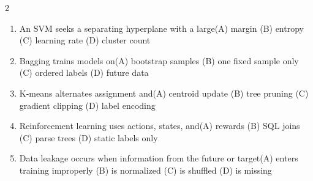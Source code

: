 \documentclass[a4paper]{article}
\begin{document}
\begin{multicols*}{2}
\begin{enumerate}[resume]
\item An SVM seeks a separating hyperplane with a large\newline\hspace*{0.6em}(A) margin \quad (B) entropy \newline\hspace*{0.6em}(C) learning rate \quad (D) cluster count
\item Bagging trains models on\newline\hspace*{0.6em}(A) bootstrap samples \quad (B) one fixed sample only \newline\hspace*{0.6em}(C) ordered labels \quad (D) future data
\item K-means alternates assignment and\newline\hspace*{0.6em}(A) centroid update \quad (B) tree pruning \newline\hspace*{0.6em}(C) gradient clipping \quad (D) label encoding
\item Reinforcement learning uses actions, states, and\newline\hspace*{0.6em}(A) rewards \quad (B) SQL joins \newline\hspace*{0.6em}(C) parse trees \quad (D) static labels only
\item Data leakage occurs when information from the future or target\newline\hspace*{0.6em}(A) enters training improperly \quad (B) is normalized \newline\hspace*{0.6em}(C) is shuffled \quad (D) is missing
\end{enumerate}
\end{multicols*}
\end{document}
